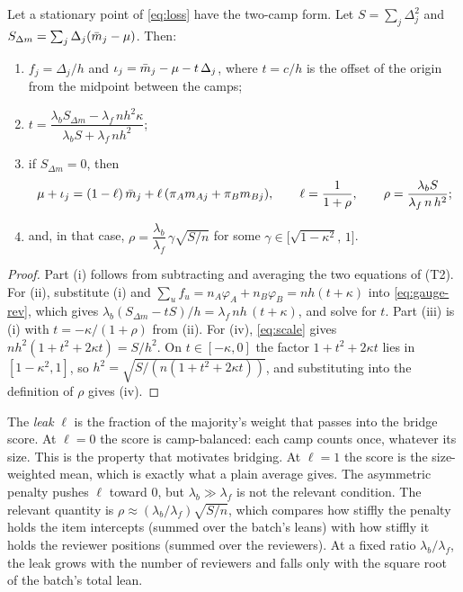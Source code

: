 \begin{proposition}\label{prop:leak}\proved{}
Let a stationary point of \eqref{eq:loss} have the two-camp form. Let $S=\sum_j\Delta_j^2$ and
$S_{\Delta m}=\sum_j\Delta_j(\bar m_j-\mu)$. Then:
\begin{enumerate}[label=(\roman*)]
  \item $f_j=\Delta_j/h$ and $\iota_j=\bar m_j-\mu-t\,\Delta_j$, where $t=c/h$ is the offset of
    the origin from the midpoint between the camps;
  \item $t=\dfrac{\lambda_b S_{\Delta m}-\lambda_f\,n h^2\kappa}{\lambda_b S+\lambda_f\,n h^2}$;
  \item if $S_{\Delta m}=0$, then
  \begin{equation}\label{eq:leak}
    \mu+\iota_j=(1-\ell)\,\bar m_j+\ell\,(\pi_Am_{Aj}+\pi_Bm_{Bj}),\qquad
    \ell=\frac{1}{1+\rho},\qquad \rho=\frac{\lambda_b S}{\lambda_f\,n\,h^2};
  \end{equation}
  \item and, in that case, $\rho=\dfrac{\lambda_b}{\lambda_f}\,\gamma\sqrt{S/n}$ for some
    $\gamma\in\bigl[\sqrt{1-\kappa^2},\,1\bigr]$.
\end{enumerate}
\end{proposition}
\begin{proof}
Part (i) follows from subtracting and averaging the two equations of (T2). For (ii),
substitute (i) and $\sum_uf_u=n_A\varphi_A+n_B\varphi_B=nh(t+\kappa)$ into
\eqref{eq:gauge-rev}, which gives $\lambda_b(S_{\Delta m}-tS)/h=\lambda_f\,nh\,(t+\kappa)$, and
solve for $t$. Part (iii) is (i) with $t=-\kappa/(1+\rho)$ from (ii). For (iv), \eqref{eq:scale}
gives $nh^2(1+t^2+2\kappa t)=S/h^2$. On $t\in[-\kappa,0]$ the factor $1+t^2+2\kappa t$ lies in
$[1-\kappa^2,1]$, so $h^2=\sqrt{S/(n(1+t^2+2\kappa t))}$, and substituting into the definition
of $\rho$ gives (iv).
\end{proof}

The \emph{leak} $\ell$ is the fraction of the majority's weight that passes into the bridge
score. At $\ell=0$ the score is camp-balanced: each camp counts once, whatever its size. This is
the property that motivates bridging. At $\ell=1$ the score is the size-weighted mean, which
is exactly what a plain average gives. The asymmetric penalty pushes $\ell$ toward $0$, but
$\lambda_b\gg\lambda_f$ is not the relevant condition. The relevant quantity is
$\rho\approx(\lambda_b/\lambda_f)\sqrt{S/n}$, which compares how stiffly the penalty holds the
item intercepts (summed over the batch's leans) with how stiffly it holds the reviewer positions
(summed over the reviewers). At a fixed ratio $\lambda_b/\lambda_f$, the leak grows with the
number of reviewers and falls only with the square root of the batch's total lean.

